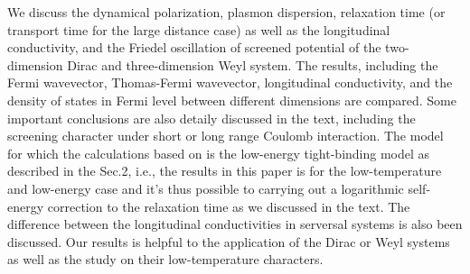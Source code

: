 \documentclass[UTF8,a4paper]{article}
\begin{document}
\begin{large}
We discuss the dynamical polarization, plasmon dispersion, relaxation time (or transport time for the large distance case)
as well as the longitudinal conductivity, and the Friedel oscillation of screened potential 
of the two-dimension Dirac and three-dimension Weyl system.
The results, including the Fermi wavevector, Thomas-Fermi wavevector, longitudinal conductivity, and the density of states in Fermi level between different
dimensions are compared.
Some important conclusions are also detaily discussed in the text, including the 
screening character under short or long range Coulomb interaction.
The model for which the calculations based on is the low-energy tight-binding model as described in the Sec.2,
i.e., the results in this paper is for the low-temperature and low-energy case
and it's thus possible to carrying out a logarithmic self-energy correction to the relaxation time as we discussed in the text.
The difference between the longitudinal conductivities in serversal systems is also been discussed.
Our results is helpful to the application of the Dirac or Weyl systems as well as the study on their low-temperature characters.


\end{large}
\renewcommand\refname{References}
\end{document}
